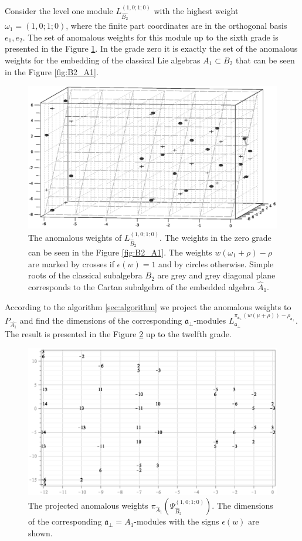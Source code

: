\documentclass[12pt]{iopart}
\theoremstyle{definition}
\newcommand{\afb}{\mathfrak{a}_{\bot}}
\begin{document}
Consider the level one module $L^{\left( 1,0;1;0 \right)}_{\hat{B_2}}$  with the highest weight $\omega_1=(1,0;1;0)$,
where the finite part coordinates are in the orthogonal basis $e_1,e_2$.
The set of anomalous weights for this module up to the sixth grade is presented in the Figure \ref{fig:affine_B2_anom_point}.
In the grade zero it is exactly the set of the anomalous weights for the embedding of
the classical Lie algebras $A_1\subset B_2$ that can be seen in the  Figure \ref{fig:B2_A1}.

\begin{figure}[h!tb]
  \includegraphics[width=140mm]{figure11.eps}
  \caption{The anomalous weights of $L^{(1,0;1;0)}_{\hat B_2 }$.
  The weights in the zero grade can be seen in the Figure \ref{fig:B2_A1}. The weights $w (\omega_1+\rho)-\rho$ are marked by crosses if $\epsilon(w)=1$ and by circles otherwise.
Simple roots of the classical subalgebra $B_2$ are grey and grey diagonal plane corresponds to the Cartan subalgebra
of the embedded algebra $\hat{A}_1$.}
  \label{fig:affine_B2_anom_point}
\end{figure}

According to the algorithm \ref{sec:algorithm} we project the anomalous weights to
$P_{\hat{A_1}}$ and find the dimensions of the corresponding
$\afb$-modules $L^{\pi_{\afb}(w(\mu+\rho))-\rho_{\afb}}_{\afb}$.
The result is presented in the Figure
\ref{fig:AffineB2_A1_anom_proj} up to the twelfth grade.
\begin{figure}[h!tb]
  \centering
  \includegraphics[width=120mm]{figure12.eps}
  \caption{The projected anomalous weights $\pi_{\hat A_1}\left(\Psi^{(1,0;1;0)}_{\hat B_2}\right)$. The dimensions of the corresponding $\afb=A_1$-modules with the signs $\epsilon(w)$ are shown.}
  \label{fig:AffineB2_A1_anom_proj}
\end{figure}
\end{document}
